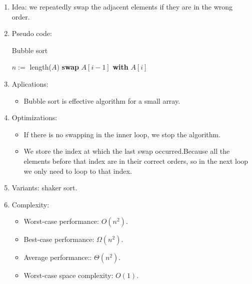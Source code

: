 \documentclass[12pt]{article}
\begin{document}
    \begin{enumerate}
        \item Idea: we repeatedly swap the adjacent elements if they are in the wrong order.
        \item Pseudo code:
        \begin{algorithm}[H]
            \caption{Bubble sort}
            \begin{algorithmic}[1]
                    \State $n:=$ length($A$)
                                \State \textbf{swap} $A[i-1]$ \textbf{with} $A[i]$
                            \EndIf
                        \EndFor
                    \EndFor
                \EndFunction
            \end{algorithmic}
        \end{algorithm}
        \item Aplications:
        \begin{itemize}
            \item Bubble sort is effective algorithm for a small array.
        \end{itemize}
        \item Optimizations:
        \begin{itemize}
            \item If there is no swapping in the inner loop, we stop the algorithm.
            \item We store the index at which the last swap occurred.Because all the elements before that index are in their correct orders, so in the next loop we only need to loop to that index.
        \end{itemize}
        \item Variants: shaker sort.
        \item Complexity:
        \begin{itemize}
            \item Worst-case performance: $O(n^2)$.
            \item Best-case performance: $\Omega(n^2)$.
            \item Average performance:: $\Theta(n^2)$.
            \item Worst-case space complexity: $O(1)$.
        \end{itemize}
    \end{enumerate}
    
\end{document}
